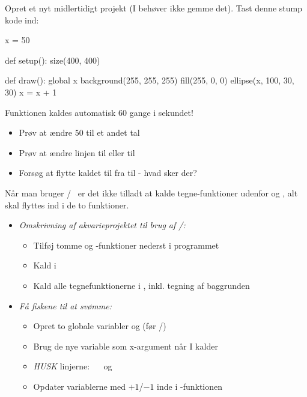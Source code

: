 \documentclass{ucph-handout}
\newcounter{handout}
\begin{document}
\newpage
{}
\begin{exercisebox}[adjusted title= Animation og funktionerne]%

Opret et nyt midlertidigt projekt (I behøver ikke gemme det). Tast
denne stump kode ind:
\begin{python}
x = 50
  
def setup():
    size(400, 400)

def draw():
    global x
    background(255, 255, 255)
    fill(255, 0, 0)
    ellipse(x, 100, 30, 30)
    x = x + 1
\end{python}

\noindent
Funktionen  kaldes automatisk 60 gange i sekundet!

\begin{itemize}
\item Prøv at ændre $50$ til et andet tal 
\item Prøv at ændre linjen  til  eller til 
\item Forsøg at flytte kaldet til  fra 
  til  - hvad sker der?
\end{itemize}


Når man bruger
/~ er det ikke tilladt at kalde
tegne-funktioner udenfor  og
, alt skal flyttes ind i de to funktioner.

\end{exercisebox}

\begin{exercisebox}[adjusted title= Akvarie fortsat]
\begin{itemize}
\item \emph{Omskrivning af akvarieprojektet til brug af /:}
  \begin{itemize}
   \item Tilføj tomme  og -funktioner nederst i programmet
    \item Kald  i 
     \item Kald alle tegnefunktionerne i , inkl. tegning af baggrunden
  \end{itemize}
  
\item \emph{Få fiskene til at svømme:}
  \begin{itemize}
  \item Opret to globale variabler  og
   (før /)
  \item Brug de nye variable som x-argument når I kalder 
  \item \emph{HUSK} linjerne: ~~ og ~~
  \item Opdater variablerne med $+1$/$-1$ inde i -funktionen
  \end{itemize}
\end{itemize}
\end{exercisebox}
\end{document}
